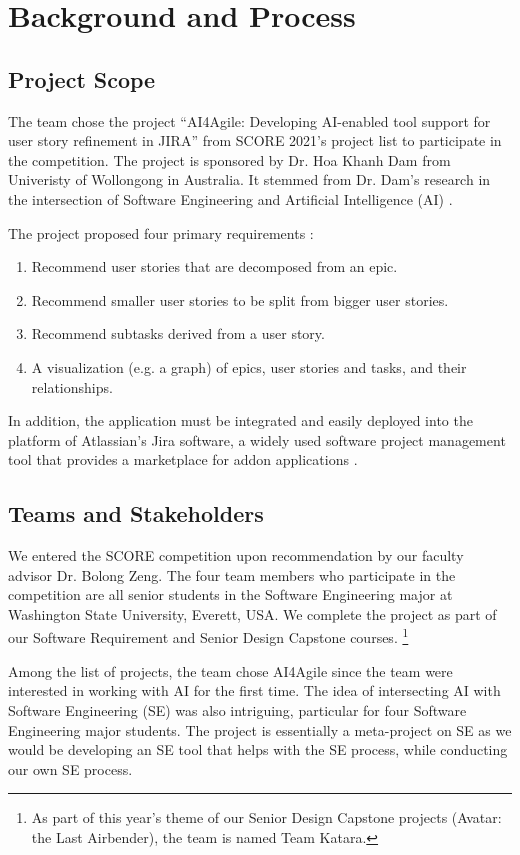 \section{Background and Process}
\label{background}
\subsection{Project Scope}
\label{scope}
The team chose the project “AI4Agile: Developing AI-enabled tool support for user story refinement in JIRA” from SCORE 2021's project list to participate in the competition. The project is sponsored by Dr. Hoa Khanh Dam from Univeristy of Wollongong in Australia. It stemmed from Dr. Dam's research in the intersection of Software Engineering and Artificial Intelligence (AI) \cite{dam1,dam2,dam3}. 

The project proposed four primary requirements \cite{proposal}:

\begin{enumerate}
	\item Recommend user stories that are decomposed from an epic.
	\item Recommend smaller user stories to be split from bigger user stories.
	\item Recommend subtasks derived from a user story.
	\item A visualization (e.g. a graph) of epics, user stories and tasks, and their relationships.
\end{enumerate}

In addition, the application must be integrated and easily deployed into the platform of Atlassian’s Jira software, a widely used software project management tool that provides a marketplace for addon applications \cite{jira1}. 

\subsection{Teams and Stakeholders}
We entered the SCORE competition upon recommendation by our faculty advisor Dr. Bolong Zeng. The four team members who participate in the competition are all senior students in the Software Engineering major at Washington State University, Everett, USA. We complete the project as part of our Software Requirement and Senior Design Capstone courses. \footnote{As part of this year's theme of our Senior Design Capstone projects (Avatar: the Last Airbender), the team is named Team Katara.} 

Among the list of projects, the team chose AI4Agile since the team were interested in working with AI for the first time. The idea of intersecting AI with Software Engineering (SE) was also intriguing, particular for four Software Engineering major students. The project is essentially a meta-project on SE as we would be developing an SE tool that helps with the SE process, while conducting our own SE process. 


